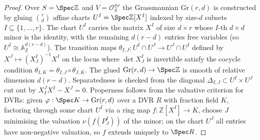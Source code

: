 \begin{proof}
  
  Over \(S = \Spec \mathbb{Z}\) and \(V = \mathcal{O}_S^{\oplus r}\) the
  Grassmannian \(\mathrm{Gr}(r, d)\) is constructed by gluing
  \(\binom{r}{d}\) affine charts \(U^I = \Spec\mathbb{Z}[X^I]\) indexed by
  size-\(d\) subsets \(I \subseteq \{1, \dots, r\}\). The chart \(U^I\)
  carries the matrix \(X^I\) of size \(d \times r\) whose \(I\)-th \(d \times d\)
  minor is the identity, with the remaining \(d(r-d)\) entries free
  variables (so \(U^I \cong \mathbb{A}^{d(r-d)}_{\mathbb{Z}}\)). The
  transition maps \(\theta_{I,J} : U^I \cap U^J \to U^J \cap U^I\) defined
  by \(X^J \mapsto (X^I_J)^{-1} X^I\) on the locus where \(\det X^I_J\) is
  invertible satisfy the cocycle condition
  \(\theta_{I,K} = \theta_{I,J} \circ \theta_{J,K}\). The glued
  \(\mathrm{Gr}(r,d) \to \Spec\mathbb{Z}\) is smooth of relative dimension
  \(d(r-d)\). Separatedness is checked from the diagonal
  \(\Delta_{I,J} \subset U^I \times U^J\) cut out by \(X^J_I X^I - X^J = 0\).
  Properness follows from the valuative criterion for DVRs: given
  \(\varphi : \Spec K \to \mathrm{Gr}(r,d)\) over a DVR \(R\) with fraction
  field \(K\), factoring through some chart \(U^I\) via a ring map
  \(f : \mathbb{Z}[X^I] \to K\), choose \(J\) minimising the valuation
  \(\nu(f(P^I_J))\) of the minor; on the chart \(U^J\) all entries have
  non-negative valuation, so \(f\) extends uniquely to \(\Spec R\).


\end{proof}
